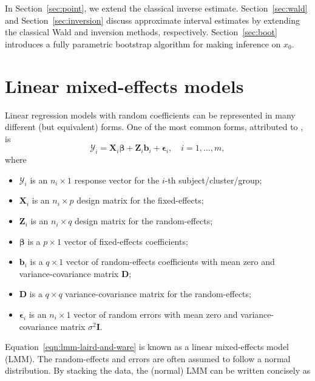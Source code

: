 \documentclass{article}\usepackage[]{graphicx}\usepackage[]{color}
\begin{document}
In Section~\ref{sec:point}, we extend the classical inverse estimate. Section~\ref{sec:wald} and Section~\ref{sec:inversion} discuss approximate interval estimates by extending the classical Wald and inversion methods, respectively. Section~\ref{sec:boot} introduces a fully parametric bootstrap algorithm for making inference on $x_0$. 




\section{Linear mixed-effects models}
\label{sec:lmm}

Linear regression models with random coefficients can be represented in many different (but equivalent) forms.  One of the most common forms, attributed to \citet{laird-random-1982}, is
\begin{equation}
\label{eqn:lmm-laird-and-ware}
  \bm{\mathcal{Y}}_i = \bm{X}_i\bm{\beta} + \bm{Z}_i\bm{b}_i + \bm{\epsilon}_i, \quad i = 1, \dotsc, m,
\end{equation}
where
\begin{itemize}
  \item $\bm{\mathcal{Y}}_i$ is an $n_i \times 1$ response vector for the $i$-th subject/cluster/group;
  \item $\bm{X}_i$ is an $n_i \times p$ design matrix for the fixed-effects;
  \item $\bm{Z}_i$ is an $n_i \times q$ design matrix for the random-effects;
  \item $\bm{\beta}$ is a $p \times 1$ vector of fixed-effects coefficients;
  \item $\bm{b}_i$ is a $q \times 1$ vector of random-effects coefficients with mean zero and variance-covariance matrix $\bm{D}$;
  \item $\bm{D}$ is a $q \times q$ variance-covariance matrix for the random-effects;
  \item $\bm{\epsilon}_i$ is an $n_i \times 1$ vector of random errors with mean zero and variance-covariance matrix $\sigma^2\bm{I}$.
\end{itemize}
Equation~\eqref{eqn:lmm-laird-and-ware} is known as a linear mixed-effects model (LMM).  The random-effects and errors are often assumed to follow a normal distribution.  By stacking the data, the (normal) LMM can be written concisely as
\end{document}
